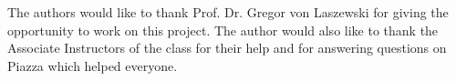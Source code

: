 \begin{acks}
  The authors would like to thank Prof. Dr. Gregor von Laszewski for giving the opportunity to work on this project.
  The author would also like to thank the Associate Instructors of the class for their help and for answering questions on Piazza which helped everyone.
\end{acks}




